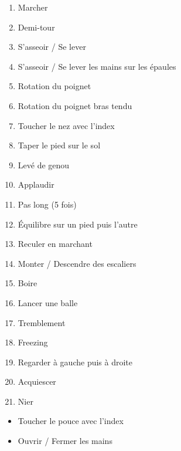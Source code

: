 \documentclass[french]{article}
\begin{document}
\begin{enumerate}
	\item Marcher
	\item Demi-tour
	\item S'asseoir / Se lever
	\item S'asseoir / Se lever les mains sur les épaules
	\item Rotation du poignet 
	\item Rotation du poignet bras tendu
	\item Toucher le nez avec l'index
	\item Taper le pied sur le sol
	\item Levé de genou
	\item Applaudir
	\item Pas long (5 fois)
	\item Équilibre sur un pied puis l'autre
	\item Reculer en marchant
	\item Monter / Descendre des escaliers
	\item Boire
	\item Lancer une balle
	\item Tremblement
	\item Freezing
	\item Regarder à gauche puis à droite
	\item Acquiescer
	\item Nier
\end{enumerate}

\begin{itemize}
	\item Toucher le pouce avec l'index
	\item Ouvrir / Fermer les mains
\end{itemize}
\end{document}
